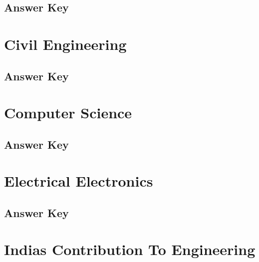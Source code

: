 \documentclass[12pt,a4paper]{book}
\newcounter{totalcounter}
\begin{document}


\subsection*{Answer Key}



\setcounter{totalcounter}{1}

\section{Civil Engineering}



\subsection*{Answer Key}



\setcounter{totalcounter}{1}

\section{Computer Science}



\subsection*{Answer Key}



\setcounter{totalcounter}{1}

\section{Electrical Electronics}



\subsection*{Answer Key}



\setcounter{totalcounter}{1}

\section{Indias Contribution To Engineering}
\end{document}
